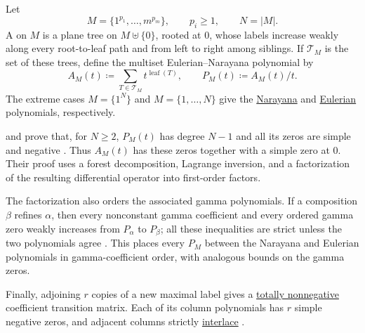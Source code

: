 \begin{example*}
Let
\[
M=\{1^{p_1},\dotsc,m^{p_m}\},
\qquad p_i\geq1,
\qquad N=|M|.
\]
A  on $M$ is a plane tree on
$M\uplus\{0\}$, rooted at $0$, whose labels increase weakly along every
root-to-leaf path and from left to right among siblings.  If $\mathcal{T}_M$
is the set of these trees, define the multiset Eulerian--Narayana polynomial
by
\[
A_M(t)\coloneqq
\sum_{T\in\mathcal{T}_M}t^{\operatorname{leaf}(T)},
\qquad
P_M(t)\coloneqq A_M(t)/t.
\]
The extreme cases $M=\{1^N\}$ and $M=\{1,\dotsc,N\}$ give the
\hyperref[classicalNarayanaPolynomialsRealRooted]{Narayana} and
\hyperref[eulerianPolynomial]{Eulerian} polynomials, respectively.

 and  prove that, for $N\geq2$,
$P_M(t)$ has degree $N-1$ and all its zeros are simple and negative
\cite[Thm.~1.1]{ZhangZhao2026x}.  Thus $A_M(t)$ has these zeros together with
a simple zero at $0$.  Their proof uses a forest decomposition, Lagrange
inversion, and a factorization of the resulting differential operator into
first-order factors.

The factorization also orders the associated gamma polynomials.  If a
composition $\beta$ refines $\alpha$, then every nonconstant gamma
coefficient and every ordered gamma zero weakly increases from $P_\alpha$ to
$P_\beta$; all these inequalities are strict unless the two polynomials agree
\cite[Thm.~1.2]{ZhangZhao2026x}.  This places every $P_M$ between the
Narayana and Eulerian polynomials in gamma-coefficient order, with analogous
bounds on the gamma zeros.

Finally, adjoining $r$ copies of a new maximal label gives a
\hyperref[totallyNonnegative]{totally nonnegative} coefficient transition
matrix.  Each of its column polynomials has $r$ simple negative zeros, and
adjacent columns strictly \hyperref[interlacingPolynomials]{interlace}
\cite[Thms.~1.3--1.4]{ZhangZhao2026x}.
\end{example*}


